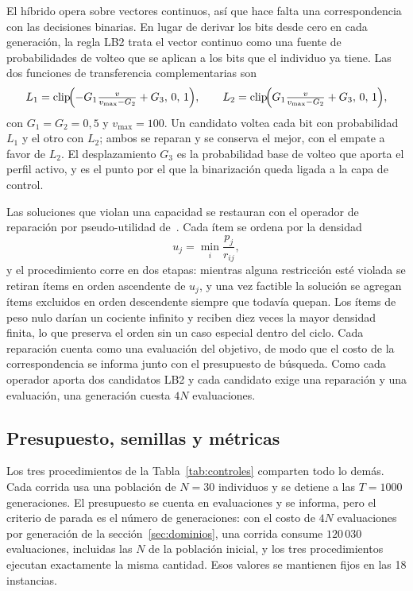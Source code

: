 \documentclass[runningheads]{llncs}
\begin{document}
El híbrido opera sobre vectores continuos, así que hace falta una correspondencia con las decisiones binarias. En lugar de derivar los bits desde cero en cada generación, la regla LB2 trata el vector continuo como una fuente de probabilidades de volteo que se aplican a los bits que el individuo ya tiene. Las dos funciones de transferencia complementarias son
\begin{equation}
L_1 = \mathrm{clip}\!\Bigl(-G_1 \tfrac{v}{v_{\max}-G_2} + G_3,\, 0,\, 1\Bigr), \qquad
L_2 = \mathrm{clip}\!\Bigl(G_1 \tfrac{v}{v_{\max}-G_2} + G_3,\, 0,\, 1\Bigr),
\label{eq:lb2}
\end{equation}
con $G_1 = G_2 = 0{,}5$ y $v_{\max} = 100$. Un candidato voltea cada bit con probabilidad $L_1$ y el otro con $L_2$; ambos se reparan y se conserva el mejor, con el empate a favor de $L_2$. El desplazamiento $G_3$ es la probabilidad base de volteo que aporta el perfil activo, y es el punto por el que la binarización queda ligada a la capa de control.

Las soluciones que violan una capacidad se restauran con el operador de reparación por pseudo-utilidad de~\cite{chu1998genetic}. Cada ítem se ordena por la densidad
\begin{equation}
u_j = \min_{i} \frac{p_j}{r_{ij}},
\label{eq:utilidad}
\end{equation}
y el procedimiento corre en dos etapas: mientras alguna restricción esté violada se retiran ítems en orden ascendente de $u_j$, y una vez factible la solución se agregan ítems excluidos en orden descendente siempre que todavía quepan. Los ítems de peso nulo darían un cociente infinito y reciben diez veces la mayor densidad finita, lo que preserva el orden sin un caso especial dentro del ciclo. Cada reparación cuenta como una evaluación del objetivo, de modo que el costo de la correspondencia se informa junto con el presupuesto de búsqueda. Como cada operador aporta dos candidatos LB2 y cada candidato exige una reparación y una evaluación, una generación cuesta $4N$ evaluaciones.

\subsection{Presupuesto, semillas y métricas}
\label{sec:protocolo}

Los tres procedimientos de la Tabla~\ref{tab:controles} comparten todo lo demás. Cada corrida usa una población de $N = 30$ individuos y se detiene a las $T = 1000$ generaciones. El presupuesto se cuenta en evaluaciones y se informa, pero el criterio de parada es el número de generaciones: con el costo de $4N$ evaluaciones por generación de la sección~\ref{sec:dominios}, una corrida consume $120\,030$ evaluaciones, incluidas las $N$ de la población inicial, y los tres procedimientos ejecutan exactamente la misma cantidad. Esos valores se mantienen fijos en las 18 instancias.
\end{document}
